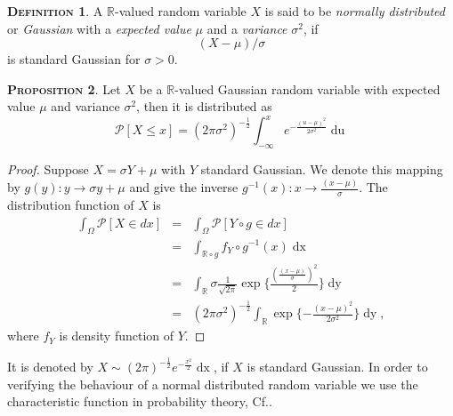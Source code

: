 \documentclass[a4paper, twoside, 11pt]{article}
\theoremstyle{definition}
\newtheorem{definition}{\scshape Definition}[section]
\newtheorem{proposition}[definition]{\scshape Proposition}
\begin{document}
\begin{definition}
  A $\mathbb{R}$-valued random variable $X$ is said to be \emph{normally distributed} or \emph{Gaussian} with a \emph{expected value} $\mu$ and a \emph{variance} $\sigma^2$, if
\[
  (X-\mu) / \sigma
\]
is standard Gaussian for $\sigma>0$.
\end{definition}

\begin{proposition}
  Let $X$ be a $\mathbb{R}$-valued Gaussian random variable with expected value $\mu$ and variance $\sigma^2$, then it is distributed as
  \begin{equation*}
	\mathcal{P}[X\le x] = (2\pi\sigma^2)^{-\frac{1}{2}}\int_{-\infty}^x e^{-\frac{(u-\mu)^2}{2\sigma^2}}\mathop{du}
  \end{equation*}
\end{proposition}

\begin{proof}
  Suppose $X = \sigma Y + \mu$ with $Y$ standard Gaussian. We denote this mapping by $g(y) : y \rightarrow \sigma y + \mu$ and give the inverse $g^{-1}(x) : x \rightarrow \frac{(x-\mu)}{\sigma}$. The distribution function of $X$ is 
  \begin{eqnarray*}
	\int_\Omega \mathcal{P}[X \in dx] &=& \int_\Omega \mathcal{P}[Y \circ g \in dx] \\
	&=& \int_{\mathbb{R}\circ g} f_Y \circ g^{-1}(x) \mathop{dx}\\
	&=& \int_{\mathbb{R}} \sigma \frac{1}{\sqrt{2\pi}} \exp\{\frac{(\frac{(x-\mu)}{\sigma})^2}{2}\} \mathop{dy}\\
	&=&  (2\pi\sigma^2)^{-\frac{1}{2}}\int_{\mathbb{R}} \exp\{-\frac{(x-\mu)^2}{2\sigma^2}\}\mathop{dy} ,
  \end{eqnarray*}
 where $f_Y$ is density function of $Y$.
\end{proof}

It is denoted by $X \sim (2\pi)^{-\frac{1}{2}}e^{-\frac{x^2}{2}}\mathop{dx} $, if $X$ is standard Gaussian. In order to verifying the behaviour of a normal distributed random variable we use the characteristic function in probability theory, Cf.\cite{bauer}. 
\end{document}
